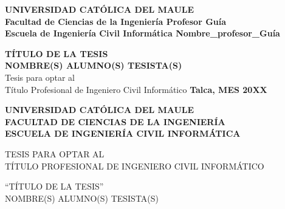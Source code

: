 \documentclass[headings=optiontohead,12pt,letterpaper,oneside,spanish]{book}
\begin{document}
\renewcommand{\listtablename}{'Indice de tablas}
\renewcommand{\tablename}{Tabla}

\thispagestyle{empty}

\textbf{
\small{
\hspace{-0.2cm}UNIVERSIDAD CATÓLICA DEL MAULE  \\
Facultad de Ciencias de la Ingeniería  \hfill  Profesor Guía\hspace{-0.1cm}\\
Escuela de Ingeniería Civil Informática \hfill  Nombre\_profesor\_Guía\\
}
}
\vspace{5cm}
\begin{center}
		{\bf {\normalsize TÍTULO DE LA TESIS}}\\
\vspace{1cm}
        {\bf {\normalsize NOMBRE(S) ALUMNO(S) TESISTA(S)}}\\
\vspace{1cm}
        {\normalsize Tesis  para optar al}\\
        {\normalsize Título Profesional de Ingeniero Civil Informático}
\vfill
\textbf{Talca, MES 20XX}
\end{center}

\newpage

\thispagestyle{empty}

\begin{center}
\textbf{
    UNIVERSIDAD CATÓLICA DEL MAULE\\
    FACULTAD DE CIENCIAS DE LA INGENIERÍA\\
    ESCUELA DE INGENIERÍA CIVIL INFORMÁTICA\\
}
\vspace{1.5cm}

TESIS PARA OPTAR AL\\
TÍTULO PROFESIONAL DE INGENIERO CIVIL INFORMÁTICO\\

\vspace{1.2cm}

``TÍTULO DE LA TESIS''\\
NOMBRE(S) ALUMNO(S) TESISTA(S)\\

\end{center}

\vspace{0.5cm}
\end{document}
